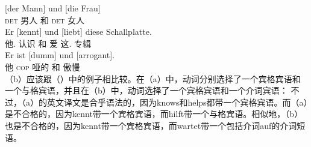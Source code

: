 \eal
\ex 
\gll {}[der Mann] und [die Frau]\\
	 {}\spacebr{}\textsc{det} 男人 和 \spacebr{}\textsc{det} 女人\\
\ex 
\gll Er [kennt] und [liebt] diese Schallplatte.\\
	 他.\nom{} \spacebr{}认识 和 \spacebr{}爱 这.\acc{} 专辑\\
\ex 
\gll Er ist [dumm] und [arrogant].\\
	他 \textsc{cop} \spacebr{}哑的 和 \spacebr{}傲慢\\
\zl
（b）应该跟（）中的例子相比较。在（a）中，动词分别选择了一个宾格宾语和一个与格宾语，并且在（b）中，动词选择了一个宾格宾语和一个介词宾语：
\eal
{}
\zl
不过，（a）的英文译文是合乎语法的，因为knows和helps都带一个宾格宾语。而（a）是不合格的，因为kennt带一个宾格宾语，而hilft带一个与格宾语。相似地，（b）也是不合格的，因为kennt带一个宾格宾语，而wartet带一个包括介词auf的介词短语。

